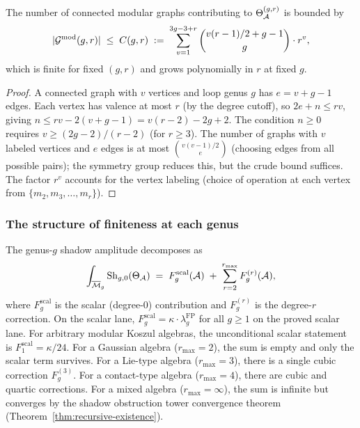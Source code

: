 \begin{proposition}
\label{prop:thqg-I-graph-count}
The number of connected modular graphs contributing to $\Theta_{\mathcal{A}}^{(g,r)}$ is bounded by
\begin{equation}\label{eq:thqg-I-graph-bound}
|\mathcal{G}^{\mathrm{mod}}(g,r)| \;\leq\; C(g,r) \;:=\; \sum_{v=1}^{3g-3+r} \binom{v(r-1)/2 + g - 1}{g} \cdot r^v,
\end{equation}
which is finite for fixed $(g,r)$ and grows polynomially in $r$ at fixed $g$.
\end{proposition}

\begin{proof}
A connected graph with $v$ vertices and loop genus $g$ has $e = v + g - 1$ edges. Each vertex has valence at most $r$ (by the degree cutoff), so $2e + n \leq rv$, giving $n \leq rv - 2(v+g-1) = v(r-2) - 2g + 2$. The condition $n \geq 0$ requires $v \geq (2g-2)/(r-2)$ (for $r \geq 3$). The number of graphs with $v$ labeled vertices and $e$ edges is at most $\binom{v(v-1)/2}{e}$ (choosing edges from all possible pairs); the symmetry group reduces this, but the crude bound suffices. The factor $r^v$ accounts for the vertex labeling (choice of operation at each vertex from $\{m_2, m_3, \ldots, m_r\}$).
\end{proof}

\subsubsection{The structure of finiteness at each genus}

\begin{proposition}
\label{prop:thqg-I-genus-g-decomposition}
The genus-$g$ shadow amplitude decomposes as
\begin{equation}\label{eq:thqg-I-genus-g-decomp}
\int_{\overline{\mathcal{M}}_g} \operatorname{Sh}_{g,0}(\Theta_{\mathcal{A}}) \;=\; F_g^{\mathrm{scal}}(\mathcal{A}) \;+\; \sum_{r=2}^{r_{\max}} F_g^{(r)}(\mathcal{A}),
\end{equation}
where $F_g^{\mathrm{scal}}$ is the scalar (degree-$0$) contribution and
$F_g^{(r)}$ is the degree-$r$ correction. On the scalar lane,
$F_g^{\mathrm{scal}} = \kappa \cdot \lambda_g^{\mathrm{FP}}$ for
all $g \geq 1$ on the proved scalar lane. For arbitrary modular
Koszul algebras, the unconditional scalar statement is
$F_1^{\mathrm{scal}}=\kappa/24$. For
a Gaussian algebra ($r_{\max} = 2$), the sum is empty and only the
scalar term survives. For a Lie-type algebra ($r_{\max} = 3$), there
is a single cubic correction $F_g^{(3)}$. For a contact-type algebra
($r_{\max} = 4$), there are cubic and quartic corrections. For a mixed
algebra ($r_{\max} = \infty$), the sum is infinite but converges by the
shadow obstruction tower convergence theorem (Theorem~\ref{thm:recursive-existence}).
\end{proposition}

